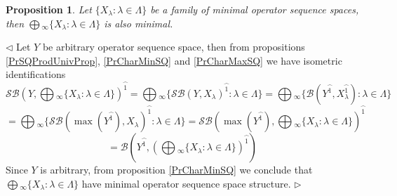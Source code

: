 \documentclass[12pt]{article}
\newtheorem{proposition}[theorem]{Proposition}
\newenvironment{proof}{\par $\triangleleft$}{$\triangleright$}
\begin{document}
\begin{proposition}\label{PrMinCommuteWithProd} Let $\{X_\lambda:\lambda\in\Lambda\}$ be a family of minimal operator sequence spaces, then $\bigoplus{}_\infty\{X_\lambda:\lambda\in\Lambda\}$ is also minimal.
\end{proposition} 
\begin{proof}
Let $Y$ be arbitrary operator sequence space, then from propositions \ref{PrSQProdUnivProp}, \ref{PrCharMinSQ} and \ref{PrCharMaxSQ} we have isometric identifications
$$
\mathcal{SB}\left(Y,\bigoplus{}_\infty\{X_\lambda:\lambda\in\Lambda\}\right)^{\wideparen{1}}
=\bigoplus{}_\infty\{\mathcal{SB}(Y,X_\lambda)^{\wideparen{1}}:\lambda\in\Lambda\}
=\bigoplus{}_\infty\{\mathcal{B}(Y^{\wideparen{1}},X_\lambda^{\wideparen{1}}):\lambda\in\Lambda\}
$$
$$
=\bigoplus{}_\infty\{\mathcal{SB}(\max(Y^{\wideparen{1}}),X_\lambda)^{\wideparen{1}}:\lambda\in\Lambda\}
=\mathcal{SB}\left(\max(Y^{\wideparen{1}}),\bigoplus{}_\infty\{X_\lambda:\lambda\in\Lambda\}\right)^{\wideparen{1}}
$$
$$
=\mathcal{B}\left(Y^{\wideparen{1}},\left(\bigoplus{}_\infty\{X_\lambda:\lambda\in\Lambda\}\right)^{\wideparen{1}}\right)
$$
Since $Y$ is arbitrary, from proposition \ref{PrCharMinSQ} we conclude that $\bigoplus{}_\infty\{X_\lambda:\lambda\in\Lambda\}$ have minimal operator sequence space structure.
\end{proof}
\end{document}
